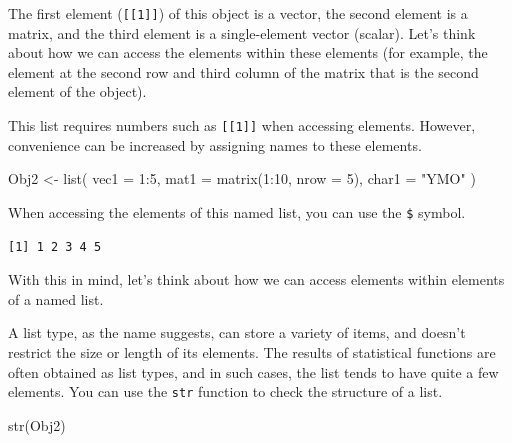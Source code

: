\documentclass[
  a4paper,
]{book}
\newenvironment{Shaded}{\begin{snugshade}}{\end{snugshade}}
\newcommand{\AttributeTok}[1]{\textcolor[rgb]{0.40,0.45,0.13}{#1}}
\newcommand{\DecValTok}[1]{\textcolor[rgb]{0.68,0.00,0.00}{#1}}
\newcommand{\FunctionTok}[1]{\textcolor[rgb]{0.28,0.35,0.67}{#1}}
\newcommand{\NormalTok}[1]{\textcolor[rgb]{0.00,0.23,0.31}{#1}}
\newcommand{\OtherTok}[1]{\textcolor[rgb]{0.00,0.23,0.31}{#1}}
\newcommand{\SpecialCharTok}[1]{\textcolor[rgb]{0.37,0.37,0.37}{#1}}
\newcommand{\StringTok}[1]{\textcolor[rgb]{0.13,0.47,0.30}{#1}}
\begin{document}
The first element (\texttt{{[}{[}1{]}{]}}) of this object is a vector,
the second element is a matrix, and the third element is a
single-element vector (scalar). Let's think about how we can access the
elements within these elements (for example, the element at the second
row and third column of the matrix that is the second element of the
object).

This list requires numbers such as \texttt{{[}{[}1{]}{]}} when accessing
elements. However, convenience can be increased by assigning names to
these elements.

\begin{Shaded}
\begin{Highlighting}[]
\NormalTok{Obj2 }\OtherTok{\textless{}{-}} \FunctionTok{list}\NormalTok{(}
  \AttributeTok{vec1 =} \DecValTok{1}\SpecialCharTok{:}\DecValTok{5}\NormalTok{,}
  \AttributeTok{mat1 =} \FunctionTok{matrix}\NormalTok{(}\DecValTok{1}\SpecialCharTok{:}\DecValTok{10}\NormalTok{, }\AttributeTok{nrow =} \DecValTok{5}\NormalTok{),}
  \AttributeTok{char1 =} \StringTok{"YMO"}
\NormalTok{)}
\end{Highlighting}
\end{Shaded}

When accessing the elements of this named list, you can use the
\texttt{\$} symbol.

\begin{Shaded}
\end{Shaded}

\begin{verbatim}
[1] 1 2 3 4 5
\end{verbatim}

With this in mind, let's think about how we can access elements within
elements of a named list.

A list type, as the name suggests, can store a variety of items, and
doesn't restrict the size or length of its elements. The results of
statistical functions are often obtained as list types, and in such
cases, the list tends to have quite a few elements. You can use the
\texttt{str} function to check the structure of a list.

\begin{Shaded}
\begin{Highlighting}[]
\FunctionTok{str}\NormalTok{(Obj2)}
\end{Highlighting}
\end{Shaded}
\end{document}
